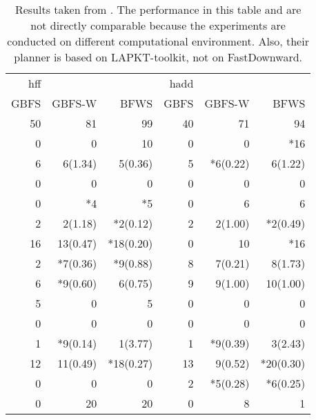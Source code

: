 \begin{table}[htb]
\caption{Results taken from \cite{lipovetzky2017bwfs}. The performance in this table and  are not directly comparable because the experiments are conducted on different computational environment. Also, their planner is based on LAPKT-toolkit, not on FastDownward.}
\centering
\begin{tabular}{rrrrrr}
hff &  &  & hadd &  & \\
GBFS & GBFS-W & BFWS & GBFS & GBFS-W & BFWS\\
50 & 81 & 99 & 40 & 71 & 94\\
0 & 0 & 10 & 0 & 0 & *16\\
6 & 6(1.34) & 5(0.36) & 5 & *6(0.22) & 6(1.22)\\
0 & 0 & 0 & 0 & 0 & 0\\
0 & *4 & *5 & 0 & 6 & 6\\
2 & 2(1.18) & *2(0.12) & 2 & 2(1.00) & *2(0.49)\\
16 & 13(0.47) & *18(0.20) & 0 & 10 & *16\\
2 & *7(0.36) & *9(0.88) & 8 & 7(0.21) & 8(1.73)\\
6 & *9(0.60) & 6(0.75) & 9 & 9(1.00) & 10(1.00)\\
5 & 0 & 5 & 0 & 0 & 0\\
0 & 0 & 0 & 0 & 0 & 0\\
1 & *9(0.14) & 1(3.77) & 1 & *9(0.39) & 3(2.43)\\
12 & 11(0.49) & *18(0.27) & 13 & 9(0.52) & *20(0.30)\\
0 & 0 & 0 & 2 & *5(0.28) & *6(0.25)\\
0 & 20 & 20 & 0 & 8 & 1\\
\end{tabular}
\end{table}
